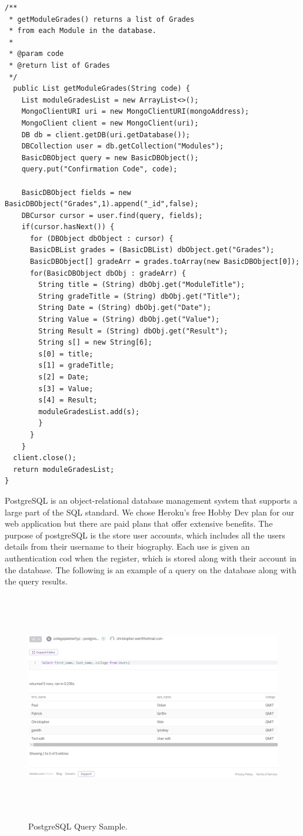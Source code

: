 \begin{verbatim}
/**
 * getModuleGrades() returns a list of Grades
 * from each Module in the database.
 * 
 * @param code
 * @return list of Grades
 */
  public List getModuleGrades(String code) {
    List moduleGradesList = new ArrayList<>();
    MongoClientURI uri = new MongoClientURI(mongoAddress);
    MongoClient client = new MongoClient(uri);
    DB db = client.getDB(uri.getDatabase());
    DBCollection user = db.getCollection("Modules");
    BasicDBObject query = new BasicDBObject();
    query.put("Confirmation Code", code);

    BasicDBObject fields = new BasicDBObject("Grades",1).append("_id",false);
    DBCursor cursor = user.find(query, fields);
    if(cursor.hasNext()) {
      for (DBObject dbObject : cursor) {
      BasicDBList grades = (BasicDBList) dbObject.get("Grades");
      BasicDBObject[] gradeArr = grades.toArray(new BasicDBObject[0]);
      for(BasicDBObject dbObj : gradeArr) {
        String title = (String) dbObj.get("ModuleTitle");
        String gradeTitle = (String) dbObj.get("Title");
        String Date = (String) dbObj.get("Date");
        String Value = (String) dbObj.get("Value");
        String Result = (String) dbObj.get("Result");
        String s[] = new String[6];
        s[0] = title;
        s[1] = gradeTitle;
        s[2] = Date;
        s[3] = Value;
        s[4] = Result;
        moduleGradesList.add(s);
        }
      }
    }
  client.close();
  return moduleGradesList;
}
\end{verbatim}

PostgreSQL is an object-relational database management system that supports a large part of the SQL standard. We chose Heroku's free Hobby Dev plan for our web application but there are paid plans that offer extensive benefits. The purpose of postgreSQL is the store user accounts, which includes all the users details from their username to their biography. Each use is given an authentication cod when the register, which is stored along with their account in the database. The following is an example of a query on the database along with the query results.

\begin{figure}[h]
\centering
\includegraphics[width=15cm, height=10cm]{img/SQL}
\caption{PostgreSQL Query Sample.}
\end{figure}

